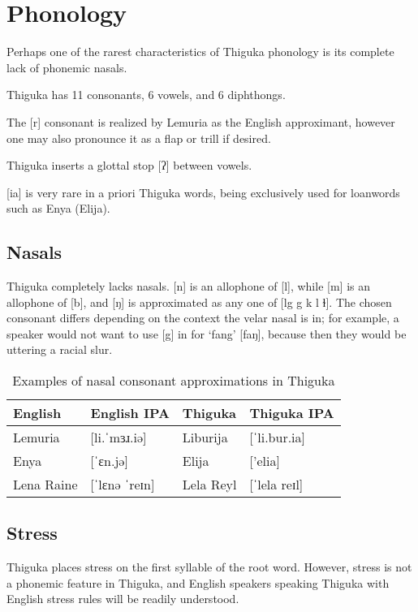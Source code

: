 \chapter{Phonology}

Perhaps one of the rarest characteristics of Thiguka phonology is its complete lack of phonemic nasals.

Thiguka has 11 consonants, 6 vowels, and 6 diphthongs.



The [r] consonant is realized by Lemuria as the English approximant, however one may also pronounce it as a flap or trill if desired.

Thiguka inserts a glottal stop [ʔ] between vowels.

[ia] is very rare in a priori Thiguka words, being exclusively used for loanwords such as Enya (Elija).

\section{Nasals}

Thiguka completely lacks nasals. [n] is an allophone of [l], while [m] is an allophone of [b], and [ŋ] is approximated as any one of [lg g k l ɫ].
The chosen consonant differs depending on the context the velar nasal is in; for example, a speaker would not want to use [g] in for `fang' [faŋ], because then they would be uttering a racial slur.

\begin{table}[h!]
    \centering
    \caption{Examples of nasal consonant approximations in Thiguka}
    \begin{tabularx}{15cm}{|X|X|X|X|}
        \hline
        \textbf{English} & \textbf{English IPA} & \textbf{Thiguka} & \textbf{Thiguka IPA} \\
        \hline
        Lemuria    & [li.ˈmɜɹ.iə]   & Liburija  & [ˈli.bur.ia] \\
        Enya       & [ˈɛn.jə]       & Elija     & ['elia] \\
        Lena Raine & [ˈlɛnə ˈreɪn]  & Lela Reyl & [ˈlela reɪl] \\
        \hline
    \end{tabularx}
\end{table}

\section{Stress}
Thiguka places stress on the first syllable of the root word.
However, stress is not a phonemic feature in Thiguka, and English speakers speaking Thiguka with English stress rules will be readily understood.

